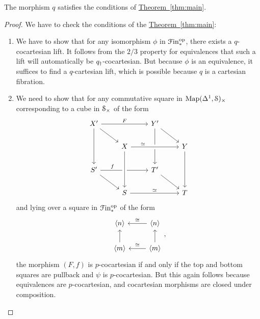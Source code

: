 \documentclass[main.tex]{subfiles}
\begin{document}
\begin{lemma}
  The morphism $q$ satisfies the conditions of \hyperref[thm:main]{Theorem~\ref*{thm:main}}.
\end{lemma}
\begin{proof}
  We have to check the conditions of the \hyperref[thm:main]{Theorem~\ref*{thm:main}}:
  \begin{enumerate}
    \item We have to show that for any isomorphism $\phi$ in $\Finp\op$, there exists a $q$-cocartesian lift. It follows from the $2/3$ property for equivalences that such a lift will automatically be $q\downdag$-cocartesian. But because $\phi$ is an equivalence, it suffices to find a $q$-cartesian lift, which is possible because $q$ is a cartesian fibration.

    \item We need to show that for any commutative square in $\Map(\Delta^{1}, \S)_{\times}$ corresponding to a cube in $\S_{\times}$ of the form
      \begin{equation*}
        \begin{tikzcd}
          X'
          \arrow[rr, "F"]
          \arrow[dd]
          \arrow[dr]
          && Y'
          \arrow[dd]
          \arrow[dr]
          \\
          & X
          \arrow[rr, crossing over, near start, "\simeq"]
          && Y
          \arrow[dd]
          \\
          S'
          \arrow[dr]
          \arrow[rr, near start, "f"]
          && T'
          \arrow[dr]
          \\
          & S
          \arrow[from=uu, crossing over]
          \arrow[rr, "\simeq"]
          && T
        \end{tikzcd}
      \end{equation*}
      and lying over a square in $\Finp\op$ of the form
      \begin{equation*}
        \begin{tikzcd}
          \langle n \rangle
          & \langle n \rangle
          \arrow[l, swap, "\cong"]
          \\
          \langle m \rangle
          \arrow[u]
          & \langle m \rangle
          \arrow[l, swap, "\cong"]
          \arrow[u]
        \end{tikzcd},
      \end{equation*}
      the morphism $(F, f)$ is $p$-cocartesian if and only if the top and bottom squares are pullback and $\psi$ is $p$-cocartesian. But this again follows because equivalences are $p$-cocartesian, and cocartesian morphisms are closed under composition.
  \end{enumerate}
\end{proof}
\end{document}
